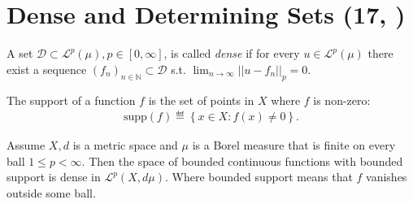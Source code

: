 \section{Dense and Determining Sets \tiny{(17, \cite{schilling2017measures})}}
\begin{definition}
    A set \(\mathcal{D}\subset\mathcal{L}^p(\mu), p\in[0,\infty]\), is called \emph{dense} if for every \(u\in\mathcal{L}^p(\mu)\) there exist
    a sequence \((f_n)_{n\in\mathbb{N}}\subset\mathcal{D}\) s.t. \(\lim_{n\rightarrow\infty}\vert\vert u-f_n\vert\vert_p=0\).
\end{definition}
\begin{definition}
    The support of a function \(f\) is the set of points in \(X\) where \(f\) is non-zero:
    \begin{align*}
        \text{supp}(f) \eqdef \left\{x\in X:f(x)\neq0\right\}.
    \end{align*}
\end{definition}
\begin{theorem}
    Assume \(X,d\) is a metric space and \(\mu\) is a Borel measure that is finite on every ball \(1\leq p<\infty\). Then the space of 
    bounded continuous functions with bounded support is dense in \(\mathcal{L}^p(X,d\mu)\). Where bounded support means that \(f\) vanishes outside
    some ball.
\end{theorem}
\ifdetailed

